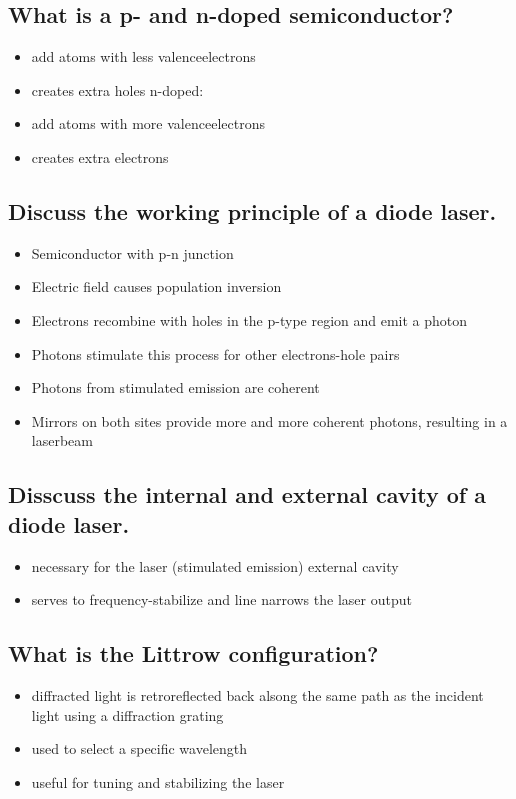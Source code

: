 \subsection{What is a p- and n-doped semiconductor?}
\begin{itemize}
    p-doped:
    \item add atoms with less valenceelectrons
    \item creates extra holes
    n-doped:
    \item add atoms with more valenceelectrons
    \item creates extra electrons
\end{itemize}

\subsection{Discuss the working principle of a diode laser.}
\begin{itemize}
    \item Semiconductor with p-n junction
    \item Electric field causes population inversion
    \item Electrons recombine with holes in the p-type region and emit a photon
    \item Photons stimulate this process for other electrons-hole pairs
    \item Photons from stimulated emission are coherent
    \item Mirrors on both sites provide more and more coherent photons, resulting in a laserbeam
\end{itemize}
\subsection{Disscuss the internal and external cavity of a diode laser.}
\begin{itemize}
    internal cavity
    \item necessary for the laser (stimulated emission)
    external cavity
    \item serves to  frequency-stabilize and line narrows the laser output
\end{itemize}
\subsection{What is the Littrow configuration?}
\begin{itemize}
    \item diffracted light is retroreflected back alsong the same path as the 
    incident light using a diffraction grating
    \item used to select a specific wavelength
    \item useful for tuning and stabilizing the laser
\end{itemize}
